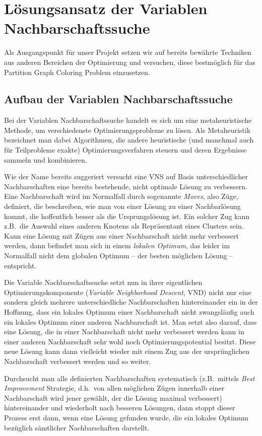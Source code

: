 \chapter{Lösungsansatz der Variablen Nachbarschaftssuche}
\label{sec:ansatz}
Als Ausgangspunkt für unser Projekt setzen wir auf bereits bewährte Techniken aus anderen Bereichen der Optimierung und versuchen, diese bestmöglich für das Partition Graph Coloring Problem einzusetzen.

\section{Aufbau der Variablen Nachbarschaftssuche}
\label{sec:vns}
Bei der Variablen Nachbarschaftssuche handelt es sich um eine metaheuristische Methode, um verschiedenste Optimierungsprobleme zu lösen. Als Metaheuristik bezeichnet man dabei Algorithmen, die andere heuristische (und manchmal auch für Teilprobleme exakte) Optimierungsverfahren steuern und deren Ergebnisse sammeln und kombinieren.

Wie der Name bereits suggeriert versucht eine VNS auf Basis unterschiedlicher Nach\-bar\-schaf\-ten eine bereits bestehende, nicht optimale Lösung zu verbessern. Eine Nachbarschaft wird im Normalfall durch sogenannte \emph{Moves}, also Züge, definiert, die beschreiben, wie man von einer Lösung zu einer Nachbarlösung kommt, die hoffentlich besser als die Ursprungslösung ist. Ein solcher Zug kann z.B.\ die Auswahl eines anderen Knotens als Repräsentant eines Clusters sein. Kann eine Lösung mit Zügen aus einer Nachbarschaft nicht mehr verbessert werden, dann befindet man sich in einem \emph{lokalen Optimum}, das leider im Normalfall nicht dem globalen Optimum -- der besten möglichen Lösung -- entspricht.

Die Variable Nachbarschaftssuche setzt nun in ihrer eigentlichen Optimierungskomponente (\emph{Variable Neighborhood Descent}, VND) nicht nur eine sondern gleich mehrere unterschiedliche Nachbarschaften hintereinander ein in der Hoffnung, dass ein lokales Optimum einer Nachbarschaft nicht zwangsläufig auch ein lokales Optimum einer anderen Nachbarschaft ist. Man setzt also darauf, dass eine Lösung, die in einer Nachbarschaft nicht mehr verbessert werden kann in einer anderen Nachbarschaft sehr wohl noch Optimierungspotential besitzt. Diese neue Lösung kann dann vielleicht wieder mit einem Zug aus der ursprünglichen Nachbarschaft verbessert werden und so weiter.

Durchsucht man alle definierten Nachbarschaften systematisch (z.B.\ mittels \emph{Best Improvement} Strategie, d.h.\ von allen möglichen Zügen innerhalb einer Nachbarschaft wird jener gewählt, der die Lösung maximal verbessert) hintereinander und wiederholt nach besseren Lösungen, dann stoppt dieser Prozess erst dann, wenn eine Lösung gefunden wurde, die ein lokales Optimum bezüglich sämtlicher Nachbarschaften darstellt.

